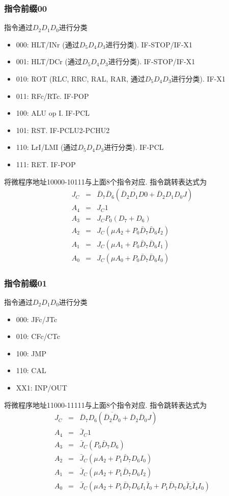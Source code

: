 \documentclass[10pt]{book}
\begin{document}
\subsubsection{指令前缀00}
指令通过$D_{2}D_{1}D_{0}$进行分类
\begin{itemize}
  \item 000: HLT/INr (通过$D_{5}D_{4}D_{3}$进行分类). IF-STOP/IF-X1
  \item 001: HLT/DCr (通过$D_{5}D_{4}D_{3}$进行分类). IF-STOP/IF-X1
  \item 010: ROT (RLC, RRC, RAL, RAR, 通过$D_{5}D_{4}D_{3}$进行分类). IF-X1
  \item 011: RFc/RTc. IF-POP
  \item 100: ALU op I. IF-PCL
  \item 101: RST. IF-PCLU2-PCHU2
  \item 110: LrI/LMI (通过$D_{5}D_{4}D_{3}$进行分类). IF-PCL
  \item 111: RET. IF-POP
\end{itemize}

将微程序地址10000-10111与上面8个指令对应. 指令跳转表达式为
\begin{eqnarray}
J_{C} &=& \bar D_{7}\bar D_{6}(\overline{\bar D_{2}D_{1}D{0}}+\bar D_{2}D_{1}D_{0}J) \\
A_{4} &=& J_{C}1 \\
A_{3} &=& J_{C}P_{0}(D_{7}+D_{6}) \\
A_{2} &=& J_{C}(\mu A_{2}+P_{0}\bar D_{7}\bar D_{6}I_{2}) \\
A_{1} &=& J_{C}(\mu A_{1}+P_{0}\bar D_{7}\bar D_{6}I_{1}) \\
A_{0} &=& J_{C}(\mu A_{0}+P_{0}\bar D_{7}\bar D_{6}I_{0}) 
\end{eqnarray}

\subsubsection{指令前缀01}
指令通过$D_{2}D_{1}D_{0}$进行分类
\begin{itemize}
  \item 000: JFc/JTc
  \item 010: CFc/CTc
  \item 100: JMP
  \item 110: CAL
  \item XX1: INP/OUT
\end{itemize}

将微程序地址11000-11111与上面8个指令对应. 指令跳转表达式为
\begin{eqnarray}
J_{C} &=& \bar D_{7}D_{6}(\overline{\bar D_{2}\bar D_{0}}+\bar D_{2}\bar D_{0}J) \\
A_{4} &=& \bar J_{C}1 \\
A_{3} &=& \bar J_{C}(P_{0}\bar D_{7}D_{6}) \\
A_{2} &=& \bar J_{C}(\mu A_{2}+P_{1}\bar D_{7}D_{6}I_{0}) \\
A_{1} &=& \bar J_{C}(\mu A_{2}+P_{1}\bar D_{7}D_{6}I_{2}) \\
A_{0} &=& \bar J_{C}(\mu A_{2}+P_{1}\bar D_{7}D_{6}I_{1}\bar I_{0}+P_{1}\bar D_{7}D_{6}\bar I_{5}\bar I_{4}I_{0})
\end{eqnarray}
\end{document}
